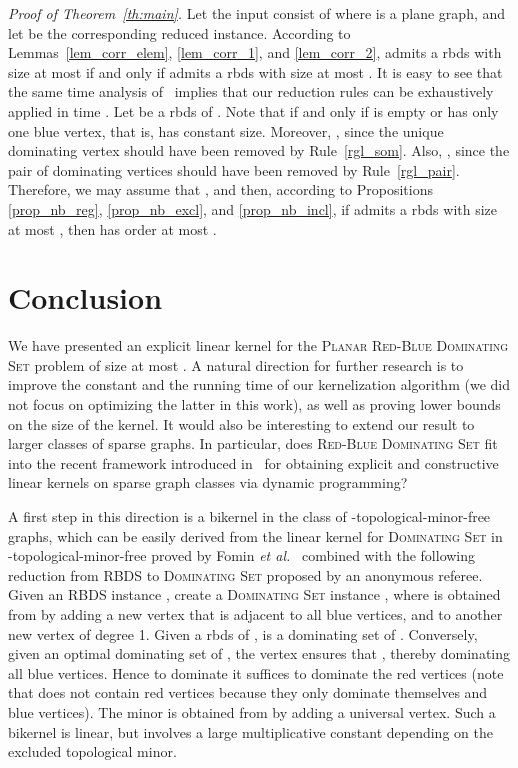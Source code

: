 \documentclass[a4paper,11pt]{article}
\newcommand{\rrgl}   [1] {Rule~\ref{#1}\xspace}
\newcommand{\dom}    [0] {\textsc{Dominating Set}\xspace}
\newcommand{\drb}    [0] {rbds\xspace}
\newcommand{\rbds}{rbds\xspace}
\newcommand{\RBDS}{\textsc{RBDS}\xspace}
\newenvironment{proofof}{\noindent \textit{Proof of Theorem~\ref{th:main}. }}{\hfill\vspace{.2cm}}
\begin{document}
\begin{proofof}
Let the input consist of  where  is a plane graph, and let  be the corresponding reduced instance. According to Lemmas~\ref{lem_corr_elem}, \ref{lem_corr_1}, and \ref{lem_corr_2},  admits a \drb with size at most  if and only if  admits a \drb with size at most . It is easy to see that the same time analysis of~\cite{AFN04} implies that our reduction rules can be exhaustively applied in time . Let  be a \drb of . Note that  if and only if  is empty or has only one blue vertex, that is,  has constant size. Moreover, , since the unique dominating vertex should have been removed by \rrgl{rgl_som}. Also, , since the pair of dominating vertices should have been removed by \rrgl{rgl_pair}. Therefore, we may assume that , and then, according to Propositions \ref{prop_nb_reg}, \ref{prop_nb_excl}, and \ref{prop_nb_incl}, if  admits a \drb with size at most , then  has order at most . \end{proofof}


\section{Conclusion}
\label{sec:concl}

We have presented an explicit linear kernel for the \textsc{Planar Red-Blue Dominating Set} problem of size at most . A natural direction for further research is to improve the constant and the running time of our kernelization algorithm (we did not focus on optimizing the latter in this work), as well as proving lower bounds on the size of the kernel. It would also be interesting to extend our result to larger classes of sparse graphs. In particular, does \textsc{Red-Blue Dominating Set} fit into the recent framework introduced in~\cite{GPST13} for obtaining explicit and constructive linear kernels on sparse graph classes via dynamic programming?

A first step in this direction is a bikernel in the class of -topological-minor-free graphs, which can be easily derived from the linear kernel for \dom in -topological-minor-free proved by Fomin \emph{et al.}~\cite{FLST13} combined with the following reduction from \RBDS to \dom proposed by an anonymous referee. Given an \RBDS instance , create a \dom instance , where  is obtained from  by adding a new vertex  that is adjacent to all blue vertices, and to another new vertex  of degree 1. Given a \rbds  of ,  is a dominating set of . Conversely, given an optimal dominating set  of , the vertex  ensures that , thereby dominating all blue vertices. Hence to dominate  it suffices to dominate the red vertices (note that  does not contain red vertices because they only dominate themselves and blue vertices). The minor  is obtained from  by adding a universal vertex. Such a bikernel is linear, but involves a large multiplicative constant depending on the excluded topological minor.
\end{document}
